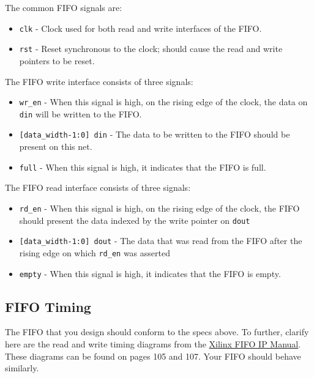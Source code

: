 \documentclass[11pt]{article}
\begin{document}
The common FIFO signals are:
\begin{itemize}
	\item \verb|clk| - Clock used for both read and write interfaces of the FIFO.
	\item \verb|rst| - Reset synchronous to the clock; should cause the read and write pointers to be reset.
\end{itemize}

The FIFO write interface consists of three signals:
\begin{itemize}
	\item \verb|wr_en| - When this signal is high, on the rising edge of the clock, the data on \verb|din| will be written to the FIFO.
	\item \verb|[data_width-1:0] din| - The data to be written to the FIFO should be present on this net.
	\item \verb|full| - When this signal is high, it indicates that the FIFO is full.
\end{itemize}

The FIFO read interface consists of three signals:
\begin{itemize}
	\item \verb|rd_en| - When this signal is high, on the rising edge of the clock, the FIFO should present the data indexed by the write pointer on \verb|dout|
	\item \verb|[data_width-1:0] dout| - The data that was read from the FIFO after the rising edge on which \verb|rd_en| was asserted
	\item \verb|empty| - When this signal is high, it indicates that the FIFO is empty.
\end{itemize}

\subsection{FIFO Timing}
The FIFO that you design should conform to the specs above. To further, clarify here are the read and write timing diagrams from the \href{https://www.xilinx.com/support/documentation/ip_documentation/fifo_generator_ug175.pdf}{Xilinx FIFO IP Manual}. These diagrams can be found on pages 105 and 107. Your FIFO should behave similarly.
\end{document}
